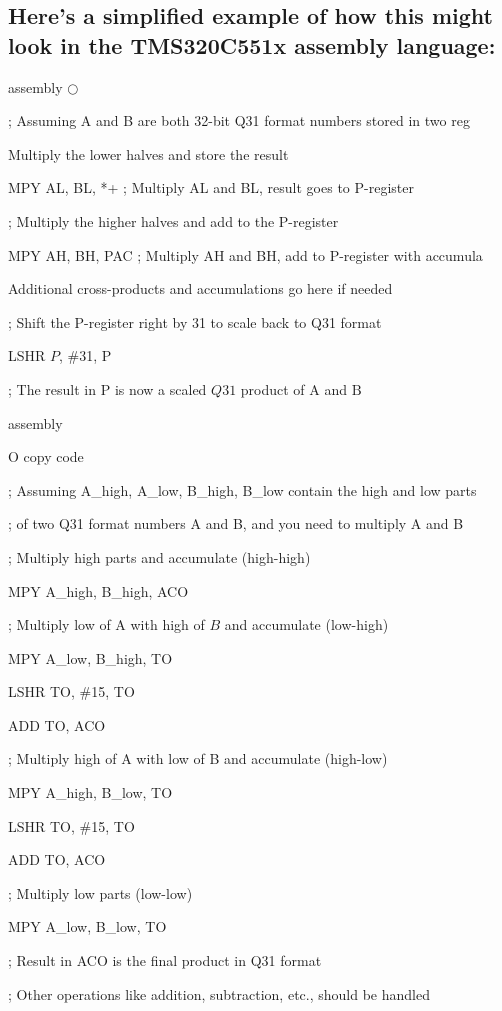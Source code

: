 \subsection{Here's a simplified example of how this might look in the TMS320C551x assembly language:}

assembly $\bigcirc$ 

; Assuming A and B are both 32-bit Q31 format numbers stored in two reg

Multiply the lower halves and store the result

MPY AL, BL, *+ ; Multiply AL and BL, result goes to P-register

; Multiply the higher halves and add to the P-register

MPY AH, BH, PAC ; Multiply AH and BH, add to P-register with accumula

Additional cross-products and accumulations go here if needed

; Shift the P-register right by 31 to scale back to Q31 format

LSHR $P$, \#31, P

; The result in $\mathrm{P}$ is now a scaled $Q 31$ product of $\mathrm{A}$ and $\mathrm{B}$

assembly

O copy code

; Assuming A\_high, A\_low, B\_high, B\_low contain the high and low parts

; of two Q31 format numbers A and B, and you need to multiply A and B

; Multiply high parts and accumulate (high-high)

MPY A\_high, B\_high, ACO

; Multiply low of A with high of $B$ and accumulate (low-high)

MPY A\_low, B\_high, TO

LSHR TO, \#15, TO

ADD TO, ACO

; Multiply high of A with low of B and accumulate (high-low)

MPY A\_high, B\_low, TO

LSHR TO, \#15, TO

ADD TO, ACO

; Multiply low parts (low-low)

MPY A\_low, B\_low, TO

; Result in ACO is the final product in Q31 format

; Other operations like addition, subtraction, etc., should be handled

